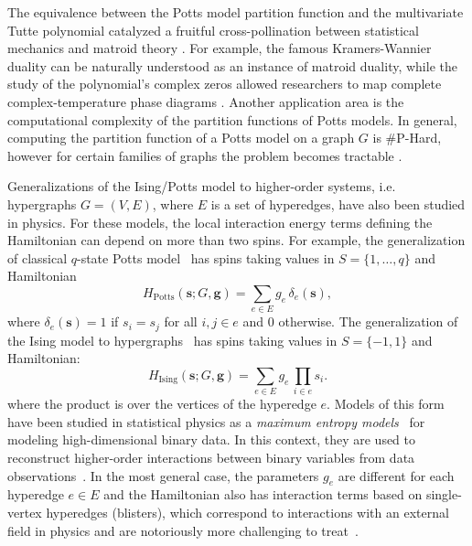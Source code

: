 \documentclass[11pt,reqno]{amsart}
\newcommand{\vecs}{\boldsymbol{s}}
\newcommand{\vecg}{\boldsymbol{g}}
\theoremstyle{plain}
\theoremstyle{definition}
\numberwithin{equation}{section}
\begin{document}
The equivalence between the Potts model partition function and the multivariate Tutte polynomial catalyzed a fruitful cross-pollination between statistical mechanics and matroid theory \cite{beaudin2010little, WM00, ellis-monaghanHandbookTuttePolynomial2022}. For example, the famous Kramers-Wannier duality can be naturally understood as an instance of matroid duality, while the study of the polynomial's complex zeros allowed researchers to map complete complex-temperature phase diagrams \cite{wegnerDualityGeneralizedIsing1971, CHANG2001234, changExactPottsModel2002, changExactPottsModel2004, salasAbsencePhaseTransition1997, jacobsenComplextemperaturePhaseDiagram2006, biggsEquimodularCurves2002, changPartitionFunctionZeros2006, chenPartitionFunctionZeros1996, martinPottsModelsRelated1991, martinZerosPartitionFunction1986}. Another application area is the computational complexity of the partition functions of Potts models. In general, computing the partition function of a Potts model on a graph $G$ is \#P-Hard, however for certain families of graphs the problem becomes tractable \cite{GJ07, Roy09, Sok05, jerrumTwodimensionalMonomerdimerSystems1987, Jaeger_Vertigan_Welsh_1990, robertsonGraphMinorsExcluding1983, robertsonGraphMinorsIII1984, robertsonGraphMinorsII1986, nobleEvaluatingTuttePolynomial1998}.

Generalizations of the Ising/Potts model to higher-order systems, i.e. hypergraphs $G=(V,E)$, where $E$ is a set of hyperedges, have also been studied in physics.
For these models, the local interaction energy terms defining the Hamiltonian can depend on more than two spins. For example, the generalization of classical $q$-state Potts model~\cite{grimmett1994potts} has spins taking values in $S = \{1, \dots, q\}$ and Hamiltonian
\[
H_{\mathrm{Potts}}(\vecs; G, \vecg) = \sum_{e \in E} g_{e}\, \delta_e(\vecs),
\]
where $\delta_e(\vecs) = 1$ if $s_i = s_j$ for all $i,j\in e$ and $0$ otherwise. The generalization of the Ising model to hypergraphs~\cite{wegnerDualityGeneralizedIsing1971, spinmod} has spins taking values in $S=\{-1,1\}$ and Hamiltonian:
\[
H_{\mathrm{Ising}}(\vecs; G, \vecg) = \sum_{e\in E} g_{e}\, \prod_{i\in e} s_i.
\]
where the product is over the vertices of the hyperedge $e$.
Models of this form have been studied in statistical physics as a \emph{maximum entropy models}~\cite{PhysRev.106.620} for modeling high-dimensional binary data. In this context, they are used to reconstruct higher-order interactions between binary variables from data observations~\cite{mastromatteo2013beyond, Gresele2017, jansma2025high}.
In the most general case, the parameters $g_e$ are different for each hyperedge $e\in E$ and the Hamiltonian also has
interaction terms based on single-vertex hyperedges (blisters), which correspond to interactions with an external field in physics and are notoriously more challenging to treat~\cite{zbMATH05956368}.
\end{document}
